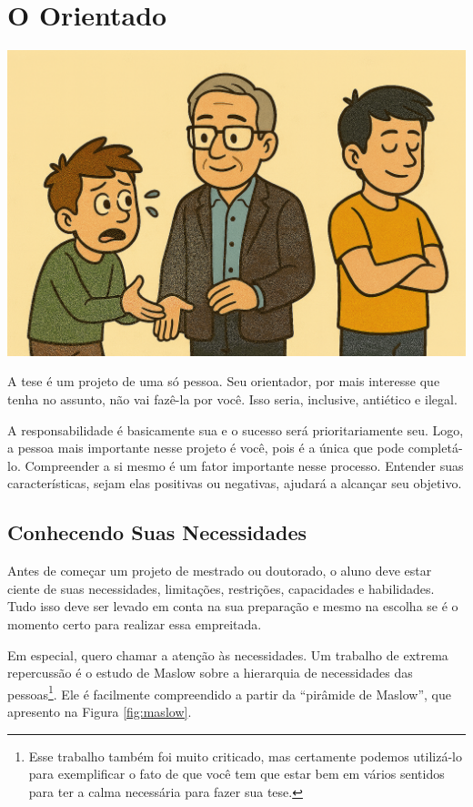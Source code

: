\chapter{O Orientado}

\begin{center}
\includegraphics[width=0.5\linewidth]{Images/alunos.png}    
\end{center}
\vspace{0.5cm}

A tese é um projeto de uma só pessoa. Seu orientador, por mais interesse que tenha no assunto, não vai fazê-la por você. Isso seria, inclusive, antiético e ilegal.


A responsabilidade é basicamente sua e o sucesso será prioritariamente seu. Logo, a pessoa mais importante nesse projeto é você, pois é a única que pode completá-lo. Compreender a si mesmo é um fator importante nesse processo. Entender suas características, sejam elas positivas ou negativas, ajudará a alcançar seu objetivo.



\section{Conhecendo Suas Necessidades}

Antes de começar um projeto de mestrado ou doutorado, o aluno deve estar ciente de suas necessidades, limitações, restrições, capacidades e habilidades. Tudo isso deve ser levado em conta na sua preparação e mesmo na escolha se é o momento certo para realizar essa empreitada.

Em especial, quero chamar a atenção às necessidades. Um trabalho de extrema repercussão é o estudo de Maslow  sobre a hierarquia de necessidades das pessoas\footnote{Esse trabalho também foi muito criticado, mas certamente podemos utilizá-lo para exemplificar o fato de que você tem que estar bem em vários sentidos para ter a calma necessária para fazer sua tese.}. Ele é facilmente compreendido a partir da “pirâmide de Maslow”, que apresento na Figura \ref{fig:maslow}.

